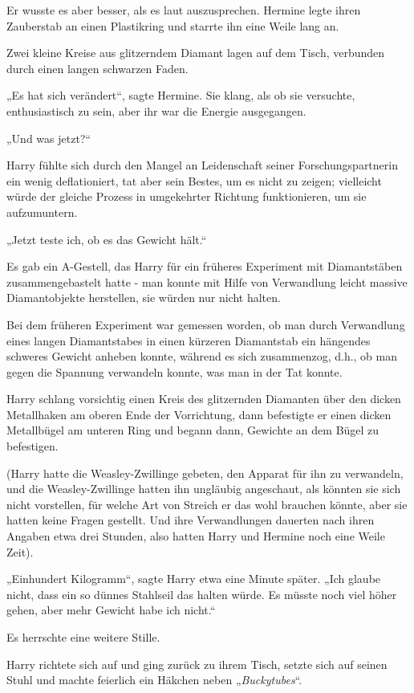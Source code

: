 {Er wusste es aber besser, als es laut auszusprechen. Hermine legte ihren Zauberstab an einen Plastikring und starrte ihn eine Weile lang an.

Zwei kleine Kreise aus glitzerndem Diamant lagen auf dem Tisch, verbunden durch einen langen schwarzen Faden.

„Es hat sich verändert“, sagte Hermine. Sie klang, als ob sie versuchte, enthusiastisch zu sein, aber ihr war die Energie ausgegangen.

„Und was jetzt?“

Harry fühlte sich durch den Mangel an Leidenschaft seiner Forschungspartnerin ein wenig deflationiert, tat aber sein Bestes, um es nicht zu zeigen; vielleicht würde der gleiche Prozess in umgekehrter Richtung funktionieren, um sie aufzumuntern.

„Jetzt teste ich, ob es das Gewicht hält.“

Es gab ein A-Gestell, das Harry für ein früheres Experiment mit Diamantstäben zusammengebastelt hatte - man konnte mit Hilfe von Verwandlung leicht massive Diamantobjekte herstellen, sie würden nur nicht halten.

Bei dem früheren Experiment war gemessen worden, ob man durch Verwandlung eines langen Diamantstabes in einen kürzeren Diamantstab ein hängendes schweres Gewicht anheben konnte, während es sich zusammenzog, d.h., ob man gegen die Spannung verwandeln konnte, was man in der Tat konnte.

Harry schlang vorsichtig einen Kreis des glitzernden Diamanten über den dicken Metallhaken am oberen Ende der Vorrichtung, dann befestigte er einen dicken Metallbügel am unteren Ring und begann dann, Gewichte an dem Bügel zu befestigen.

(Harry hatte die Weasley-Zwillinge gebeten, den Apparat für ihn zu verwandeln, und die Weasley-Zwillinge hatten ihn ungläubig angeschaut, als könnten sie sich nicht vorstellen, für welche Art von Streich er das wohl brauchen könnte, aber sie hatten keine Fragen gestellt. Und ihre Verwandlungen dauerten nach ihren Angaben etwa drei Stunden, also hatten Harry und Hermine noch eine Weile Zeit).

„Einhundert Kilogramm“, sagte Harry etwa eine Minute später. „Ich glaube nicht, dass ein so dünnes Stahlseil das halten würde. Es müsste noch viel höher gehen, aber mehr Gewicht habe ich nicht.“

Es herrschte eine weitere Stille.

Harry richtete sich auf und ging zurück zu ihrem Tisch, setzte sich auf seinen Stuhl und machte feierlich ein Häkchen neben „\emph{Buckytubes}“.

}
